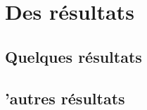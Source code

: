 \chapter{Des résultats}
\minitoc

\section{Quelques résultats}
\blindtext[10]


\section{'autres résultats}
\blindtext[10]

